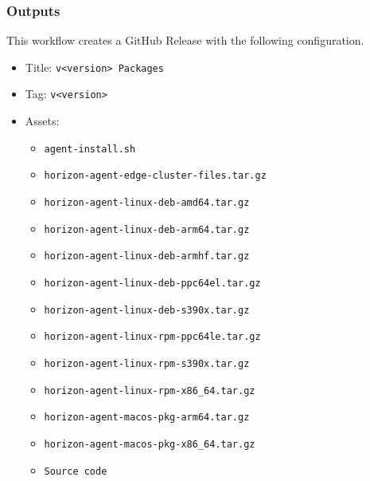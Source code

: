 \documentclass[a4paper,11pt]{article}
\begin{document}
\subsubsection{Outputs}
This workflow creates a GitHub Release with the following configuration.
\begin{itemize}
    \item Title: \verb|v<version> Packages|
    \item Tag: \verb|v<version>|
    \item Assets:
    \begin{itemize}
        \item\verb|agent-install.sh|
        \item\verb|horizon-agent-edge-cluster-files.tar.gz|
        \item\verb|horizon-agent-linux-deb-amd64.tar.gz|
        \item\verb|horizon-agent-linux-deb-arm64.tar.gz|
        \item\verb|horizon-agent-linux-deb-armhf.tar.gz|
        \item\verb|horizon-agent-linux-deb-ppc64el.tar.gz|
        \item\verb|horizon-agent-linux-deb-s390x.tar.gz|
        \item\verb|horizon-agent-linux-rpm-ppc64le.tar.gz|
        \item\verb|horizon-agent-linux-rpm-s390x.tar.gz|
        \item\verb|horizon-agent-linux-rpm-x86_64.tar.gz|
        \item\verb|horizon-agent-macos-pkg-arm64.tar.gz|
        \item\verb|horizon-agent-macos-pkg-x86_64.tar.gz|
        \item\verb|Source code|
    \end{itemize}
\end{itemize}
\end{document}
